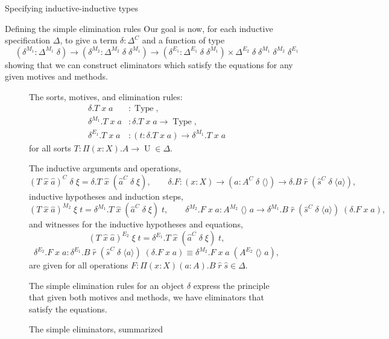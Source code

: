 \documentclass[runningheads]{llncs}
\DeclareMathOperator{\USet}{Type}
\DeclareMathOperator{\UU}{U}
\newcommand{\Id}[2]{{#1}\equiv{#2}}
\def\emptytuple{\langle\rangle}
\begin{document}
{\begin{section}{Specifying inductive-inductive types}
\begin{subsection}{\label{simple-elim-section}Defining the simple elimination rules}
Our goal is now, for each inductive specification $\Delta$, to give a term $\delta : \Delta^C$ and a function of type \[(\delta^{M_1} : \Delta^{M_1}\;\delta) \to (\delta^{M_2} : \Delta^{M_2}\;\delta\;\delta^{M_1}) \to (\delta^{E_1} : \Delta^{E_1}\;\delta\;\delta^{M_1}) \times \Delta^{E_2}\;\delta\;\delta^{M_1}\;\delta^{M_2}\;\delta^{E_1}\] showing that we can construct eliminators which satisfy the equations for any given motives and methods.

\begin{figure}[htpb]
    \begin{flushleft}
        The sorts, motives, and elimination rules:
        \begin{align*}
        \delta.T\;x\;a &: \USet,\\
        \delta^{M_1}.T\;x\;a &: \delta.T\;x\;a \to \USet,\\
        \delta^{E_1}.T\;x\;a &: (t : \delta.T\;x\;a) \to \delta^{M_1}.T\;x\;a
        \end{align*}
        for all sorts $T : \Pi(x : X).A\to\UU \in\Delta$.
        
        The inductive arguments and operations,
        \[(T\;\hat{x}\;\hat{a})^C\;\delta\;\xi = \delta.T\;\hat{x}\;(\hat{a}^C\;\delta\;\xi),
        \qquad\delta.F : (x : X) \to (a : A^C\;\delta\;\emptytuple) \to \delta.B\;\hat{r}\;(\hat{s}^C\;\delta\;\langle a\rangle),\]
        inductive hypotheses and induction steps,
        \[(T\;\hat{x}\;\hat{a})^{M_2}\;\xi\;t = \delta^{M_1}.T\;\hat{x}\;(\hat{a}^C\;\delta\;\xi)\;t,
        \qquad\delta^{M_2}.F\;x\;a : A^{M_2}\;\emptytuple\;a \to \delta^{M_1}.B\;\hat{r}\;(\hat{s}^C\;\delta\;\langle a \rangle)\;(\delta.F\;x\;a),\]
        and witnesses for the inductive hypotheses and equations,
        \[(T\;\hat{x}\;\hat{a})^{E_2}\;\xi\;t = \delta^{E_1}.T\;\hat{x}\;(\hat{a}^C\;\delta\;\xi)\;t,\]
        \[\delta^{E_2}.F\;x\;a : \Id{\delta^{E_1}.B\;\hat{r}\;(\hat{s}^C\;\delta\;\langle a \rangle)\;(\delta.F\;x\;a)}{\delta^{M_2}.F\;x\;a\;(A^{E_2}\;\emptytuple\;a)},\]
        are given for all operations $F : \Pi(x : X)(a : A).B\;\hat{r}\;\hat{s} \in \Delta$.
        
        The simple elimination rules for an object $\delta$ express the principle that given both motives and methods, we have eliminators that satisfy the equations.
    \end{flushleft}
    
    \caption{\label{simple-elim-translation}The simple eliminators, summarized}
\end{figure}


\end{subsection}
\end{section}}
\end{document}
